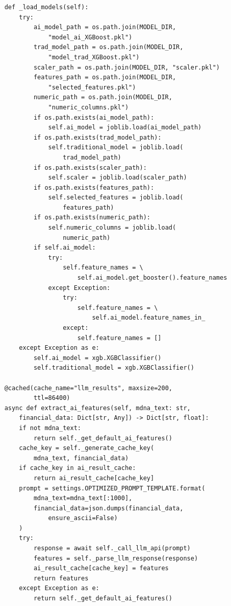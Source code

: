 \documentclass[a4paper,10pt]{article}
\begin{document}
\begin{lstlisting}
    def _load_models(self):
        try:
            ai_model_path = os.path.join(MODEL_DIR,
                "model_ai_XGBoost.pkl")
            trad_model_path = os.path.join(MODEL_DIR,
                "model_trad_XGBoost.pkl")
            scaler_path = os.path.join(MODEL_DIR, "scaler.pkl")
            features_path = os.path.join(MODEL_DIR,
                "selected_features.pkl")
            numeric_path = os.path.join(MODEL_DIR,
                "numeric_columns.pkl")
            if os.path.exists(ai_model_path):
                self.ai_model = joblib.load(ai_model_path)
            if os.path.exists(trad_model_path):
                self.traditional_model = joblib.load(
                    trad_model_path)
            if os.path.exists(scaler_path):
                self.scaler = joblib.load(scaler_path)
            if os.path.exists(features_path):
                self.selected_features = joblib.load(
                    features_path)
            if os.path.exists(numeric_path):
                self.numeric_columns = joblib.load(
                    numeric_path)
            if self.ai_model:
                try:
                    self.feature_names = \
                        self.ai_model.get_booster().feature_names
                except Exception:
                    try:
                        self.feature_names = \
                            self.ai_model.feature_names_in_
                    except:
                        self.feature_names = []
        except Exception as e:
            self.ai_model = xgb.XGBClassifier()
            self.traditional_model = xgb.XGBClassifier()

    @cached(cache_name="llm_results", maxsize=200,
            ttl=86400)
    async def extract_ai_features(self, mdna_text: str,
        financial_data: Dict[str, Any]) -> Dict[str, float]:
        if not mdna_text:
            return self._get_default_ai_features()
        cache_key = self._generate_cache_key(
            mdna_text, financial_data)
        if cache_key in ai_result_cache:
            return ai_result_cache[cache_key]
        prompt = settings.OPTIMIZED_PROMPT_TEMPLATE.format(
            mdna_text=mdna_text[:1000],
            financial_data=json.dumps(financial_data,
                ensure_ascii=False)
        )
        try:
            response = await self._call_llm_api(prompt)
            features = self._parse_llm_response(response)
            ai_result_cache[cache_key] = features
            return features
        except Exception as e:
            return self._get_default_ai_features()


\end{lstlisting}
\end{document}

